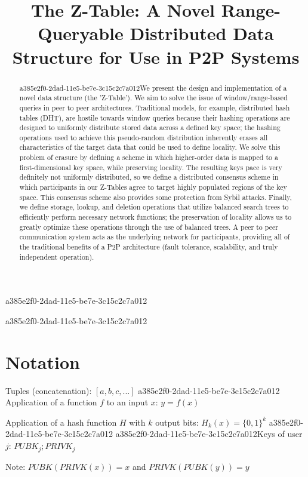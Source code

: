 \documentclass[12pt]{article}
\title{The Z-Table: A Novel Range-Queryable Distributed Data Structure for Use in P2P Systems}
\begin{document}
\maketitle
a385e2f0-2dad-11e5-be7e-3c15c2c7a012
\begin{abstract}
a385e2f0-2dad-11e5-be7e-3c15c2c7a012We present the design and implementation of a novel data structure (the 'Z-Table'). We aim to solve the issue of window/range-based queries in peer to peer architectures. Traditional models, for example,  distributed hash tables (DHT), are hostile towards window queries because their hashing operations are designed to uniformly distribute stored data across a defined key space; the hashing operations used to achieve this pseudo-random distribution inherently erases all characteristics of the target data that could be used to define locality. We solve this problem of erasure by defining a scheme in which higher-order data is mapped to a first-dimensional key space, while preserving locality. The resulting keys pace is very definitely not uniformly distributed, so we define a distributed consensus scheme in which participants in our Z-Tables agree to target highly populated regions of the key space. This consensus scheme also provides some protection from Sybil attacks. Finally, we define storage, lookup, and deletion operations that utilize balanced search trees to efficiently perform necessary network functions; the preservation of locality allows us to greatly optimize these operations through the use of balanced trees. A peer to peer communication system acts as the underlying network for participants, providing all of the traditional benefits of a P2P architecture (fault tolerance, scalability, and truly independent operation).
\end{abstract}

a385e2f0-2dad-11e5-be7e-3c15c2c7a012\section{Notation}

Tuples (concatenation): $[a,b,c,...]$
a385e2f0-2dad-11e5-be7e-3c15c2c7a012
Application of a function $f$ to an input $x$: $y=f(x)$

Application of a hash function $H$ with $k$ output bits: $H_{k}(x) = \{0,1\}^k$
a385e2f0-2dad-11e5-be7e-3c15c2c7a012
a385e2f0-2dad-11e5-be7e-3c15c2c7a012Keys of user $j$: $ PUBK_j; PRIVK_j $

Note: $PUBK(PRIVK(x)) = x$ and $PRIVK(PUBK(y)) = y$~
\end{document}
